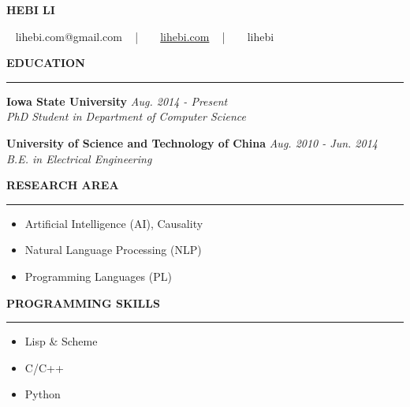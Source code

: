\documentclass[10pt,letterpaper]{article}
\newenvironment{mysection}[1]{ %
  \medskip
  \MakeUppercase{\bf #1}
  \medskip
  \hrule
  \medskip
  \begin{list}{}{
      \setlength{\leftmargin}{1.5em}
    }
  \item[]
}{
  \end{list}
}
\begin{document}
\centerline{\MakeUppercase{\huge\bf Hebi Li}}
\medskip
\centerline{\faEnvelope ~ lihebi.com@gmail.com ~ | ~ \faHome ~
  \href{http://lihebi.com}{lihebi.com} ~ | ~ \faGithubSquare ~ lihebi
}

\begin{mysection}{Education}
  \textbf{Iowa State University} \hfill \emph{Aug. 2014 - Present} \\
  \emph{PhD Student in Department of Computer Science}

  \textbf{University of Science and Technology of China}
  \hfill \emph{Aug. 2010 - Jun. 2014} \\
  \emph{B.E. in Electrical Engineering}
\end{mysection}


\begin{minipage}{0.5\textwidth}
  \begin{mysection}{Research Area}
    \begin{itemize}
    \item Artificial Intelligence (AI), Causality
    \item Natural Language Processing (NLP)
    \item Programming Languages (PL)
    \end{itemize}
  \end{mysection}
\end{minipage}
\begin{minipage}{0.5\textwidth}
  \begin{mysection}{Programming Skills}
    \begin{itemize}
    \item Lisp \& Scheme
    \item C/C++
    \item Python
    \end{itemize}
  \end{mysection}
\end{minipage}
  
\end{document}
